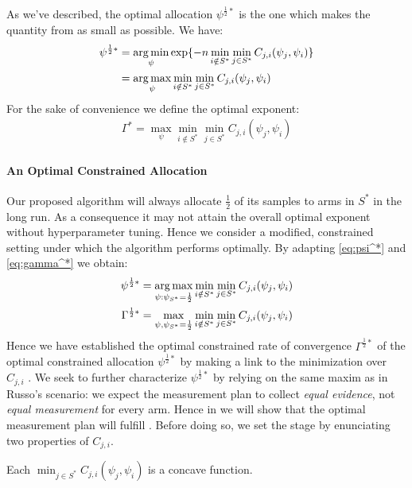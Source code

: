 As we've described, the optimal allocation $\psi^{\frac{1}{2}*}$ is the one which makes the quantity from  as small as possible. We have:
\begin{align}
  \psi^{\frac{1}{2}*} &= \operatorname*{arg\,min}_{\psi} \exp\{-n \min_{i \notin S^*}\min_{j \in S^*} C_{j, i}(\psi_j, \psi_i)\} \\
    &= \operatorname*{arg\,max}_{\psi} \min_{i \notin S^*}\min_{j \in S^*} C_{j, i}(\psi_j, \psi_i) \label{eq:psi^*}
\end{align}
For the sake of convenience we define the optimal exponent:
\begin{align}
  \Gamma^* = \max_{\psi} \min_{i \notin S^*}\min_{j \in S^*} C_{j, i}(\psi_j, \psi_i) \label{eq:gamma^*}
\end{align}

\paragraph{An Optimal Constrained Allocation}

Our proposed algorithm will always allocate $\frac{1}{2}$ of its samples to arms in $S^*$ in the long run. As a consequence it may not attain the overall optimal exponent without hyperparameter tuning. Hence we consider a modified, constrained setting under which the algorithm performs optimally. By adapting \eqref{eq:psi^*} and \eqref{eq:gamma^*} we obtain:
\begin{align}
  \psi^{\frac{1}{2}*} &= \operatorname*{arg\,max}_{\psi: \psi_{S^*}=\frac{1}{2}} \min_{i \notin S^*}\min_{j \in S^*} C_{j, i}(\psi_j, \psi_i) \label{eq:constrained_optimal_psi}\\
  \Gamma^{\frac{1}{2}*} &= \max_{\psi, \psi_{S^*} = \frac{1}{2}} \min_{i \notin S^*} \min_{j \in S^*} C_{j, i}(\psi_j, \psi_i) \label{eq:constrained_optimal_gamma}
\end{align}
Hence we have established the optimal constrained rate of convergence $\Gamma^{\frac{1}{2}*}$ of the optimal constrained allocation $\psi^{\frac{1}{2}*}$ by making a link to the minimization over $C_{j, i}$ . We seek to further characterize $\psi^{\frac{1}{2}*}$ by relying on the same maxim as in Russo's scenario: we expect the measurement plan to collect \emph{equal evidence}, not \emph{equal measurement} for every arm. Hence in  we will show that the optimal measurement plan will fulfill . Before doing so, we set the stage by enunciating two properties of $C_{j, i}$.

\begin{lemma}\label{lemma:C_concave}
  Each $\min_{j \in S^*} C_{j, i}(\psi_j, \psi_i)$ is a concave function.
\end{lemma}

